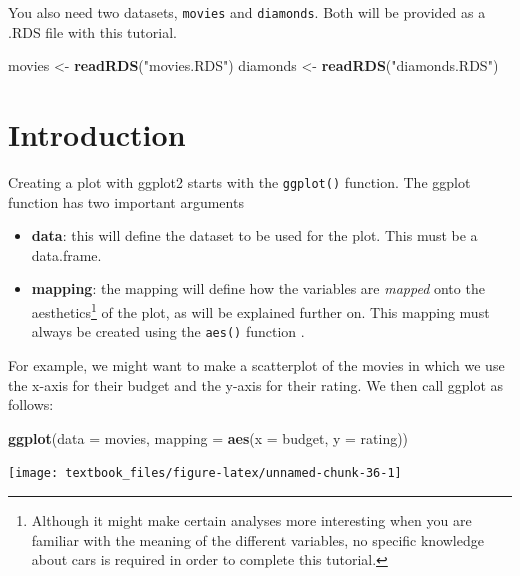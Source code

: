\documentclass[]{tufte-book}
\newenvironment{Shaded}{}{}
\newcommand{\DataTypeTok}[1]{\textcolor[rgb]{0.56,0.13,0.00}{#1}}
\newcommand{\KeywordTok}[1]{\textcolor[rgb]{0.00,0.44,0.13}{\textbf{#1}}}
\newcommand{\NormalTok}[1]{#1}
\newcommand{\StringTok}[1]{\textcolor[rgb]{0.25,0.44,0.63}{#1}}
\providecommand{\tightlist}{%
  \setlength{\itemsep}{0pt}\setlength{\parskip}{0pt}}
\begin{document}
You also need two datasets, \texttt{movies} and \texttt{diamonds}. Both will be provided as a .RDS file with this tutorial.

\begin{Shaded}
\begin{Highlighting}[]
\NormalTok{movies <-}\StringTok{ }\KeywordTok{readRDS}\NormalTok{(}\StringTok{"movies.RDS"}\NormalTok{)}
\NormalTok{diamonds <-}\StringTok{ }\KeywordTok{readRDS}\NormalTok{(}\StringTok{"diamonds.RDS"}\NormalTok{)}
\end{Highlighting}
\end{Shaded}

\hypertarget{introduction}{%
\section{Introduction}\label{introduction}}

Creating a plot with ggplot2 starts with the \texttt{ggplot()} function. The ggplot function has two important arguments

\begin{itemize}
\tightlist
\item
  \textbf{data}: this will define the dataset to be used for the plot. This must be a data.frame.
\item
  \textbf{mapping}: the mapping will define how the variables are \emph{mapped} onto the aesthetics\footnote{Although it might make certain analyses more interesting when you are familiar with the meaning of the different variables, no specific knowledge about cars is required in order to complete this tutorial.} of the plot, as will be explained further on. This mapping must always be created using the \texttt{aes()} function .
\end{itemize}

For example, we might want to make a scatterplot of the movies in which we use the x-axis for their budget and the y-axis for their rating. We then call ggplot as follows:

\begin{Shaded}
\begin{Highlighting}[]
\KeywordTok{ggplot}\NormalTok{(}\DataTypeTok{data =}\NormalTok{ movies, }\DataTypeTok{mapping =} \KeywordTok{aes}\NormalTok{(}\DataTypeTok{x =}\NormalTok{ budget, }\DataTypeTok{y =}\NormalTok{ rating))}
\end{Highlighting}
\end{Shaded}

\texttt{[image: textbook\_files/figure-latex/unnamed-chunk-36-1]}
\end{document}
